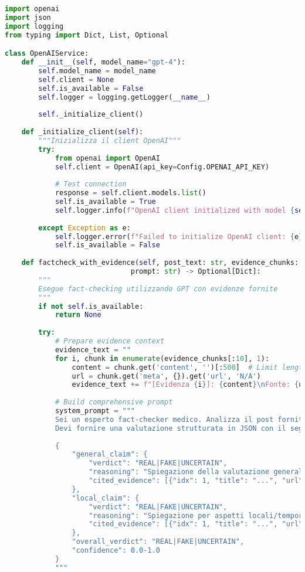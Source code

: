 \documentclass[12pt,a4paper]{report}
\begin{document}
\begin{lstlisting}[language=Python, caption=OpenAI Service Provider]
import openai
import json
import logging
from typing import Dict, List, Optional

class OpenAIService:
    def __init__(self, model_name="gpt-4"):
        self.model_name = model_name
        self.client = None
        self.is_available = False
        self.logger = logging.getLogger(__name__)
        
        self._initialize_client()
    
    def _initialize_client(self):
        """Inizializza il client OpenAI"""
        try:
            from openai import OpenAI
            self.client = OpenAI(api_key=Config.OPENAI_API_KEY)
            
            # Test connection
            response = self.client.models.list()
            self.is_available = True
            self.logger.info(f"OpenAI client initialized with model {self.model_name}")
            
        except Exception as e:
            self.logger.error(f"Failed to initialize OpenAI client: {e}")
            self.is_available = False
    
    def factcheck_with_evidence(self, post_text: str, evidence_chunks: List[dict], 
                              prompt: str) -> Optional[Dict]:
        """
        Esegue fact-checking utilizzando GPT con evidenze fornite
        """
        if not self.is_available:
            return None
        
        try:
            # Prepare evidence context
            evidence_text = ""
            for i, chunk in enumerate(evidence_chunks[:10], 1):
                content = chunk.get('content', '')[:500]  # Limit length
                url = chunk.get('meta', {}).get('url', 'N/A')
                evidence_text += f"[Evidenza {i}]: {content}\nFonte: {url}\n\n"
            
            # Build comprehensive prompt
            system_prompt = """
            Sei un esperto fact-checker medico. Analizza il post fornito utilizzando le evidenze scientifiche.
            Devi fornire una valutazione strutturata in JSON con il seguente formato:
            
            {
                "general_claim": {
                    "verdict": "REAL|FAKE|UNCERTAIN",
                    "reasoning": "Spiegazione della valutazione generale",
                    "cited_evidence": [{"idx": 1, "title": "...", "url": "..."}]
                },
                "local_claim": {
                    "verdict": "REAL|FAKE|UNCERTAIN", 
                    "reasoning": "Spiegazione per aspetti locali/temporali specifici",
                    "cited_evidence": [{"idx": 1, "title": "...", "url": "..."}]
                },
                "overall_verdict": "REAL|FAKE|UNCERTAIN",
                "confidence": 0.0-1.0
            }
            """
            

\end{lstlisting}
\end{document}

